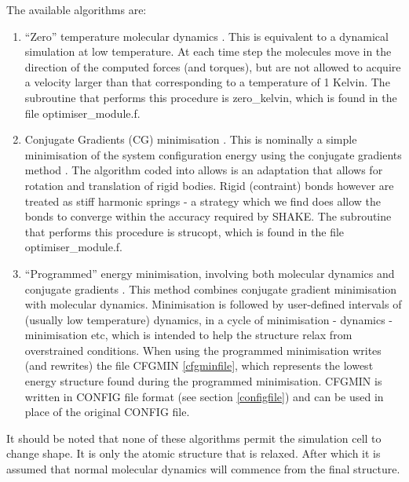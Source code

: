 {{The available algorithms are:
\begin{enumerate}
\item ``Zero'' temperature molecular dynamics 
      . This is equivalent 
      to a dynamical simulation at
      low temperature. At each time step the molecules move in the
      direction of the computed forces (and torques), but are not
      allowed to acquire a velocity larger than that corresponding to
      a temperature of 1 Kelvin. The subroutine that performs this
      procedure is {\sc zero\_kelvin}, which is found in the file {\sc
      optimiser\_module.f}.

\item Conjugate Gradients (CG) minimisation 
      . This is nominally a 
      simple minimisation of the system
      configuration energy using the conjugate gradients method
      \cite{shewchuk-94a}. The algorithm coded into \D{} allows is an adaptation
      that allows for rotation and translation of rigid bodies. Rigid
      (contraint) bonds however are treated as stiff harmonic springs - a
      strategy which we find does allow the bonds to converge within the
      accuracy required by SHAKE. The subroutine that performs this procedure
      is {\sc strucopt}, which is found in the file {\sc optimiser\_module.f}.
\item ``Programmed'' energy minimisation, involving both molecular 
      dynamics and conjugate gradients
      .  This method combines conjugate
      gradient minimisation with molecular dynamics. Minimisation is
      followed by user-defined intervals of (usually low temperature)
      dynamics, in a cycle of minimisation - dynamics - minimisation
      etc, which is intended to help the structure relax from
      overstrained conditions. When using the programmed minimisation
      \D{} writes (and rewrites) the file CFGMIN \ref{cfgminfile}, which
      represents the lowest energy structure found during the
      programmed minimisation. CFGMIN is written in CONFIG file format
      (see section \ref{configfile}) and can be used in place of the
      original CONFIG file.
\end{enumerate}

It should be noted that none of these algorithms permit the simulation
cell to change shape. It is only the atomic structure that is relaxed.
After which it is assumed that normal molecular dynamics will commence
from the final structure.

}}
